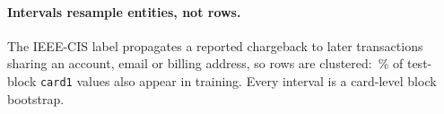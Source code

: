 \paragraph{Intervals resample entities, not rows.} The IEEE-CIS label propagates a reported
chargeback to later transactions sharing an account, email or billing address, so rows are
clustered: \ClaimCardOverlap\,\% of test-block \texttt{card1} values also appear in training.
Every interval is a card-level block bootstrap.
